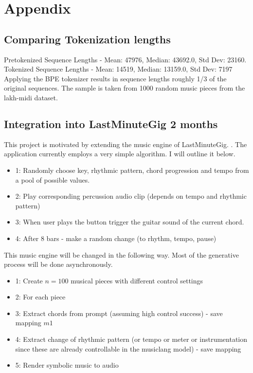 
\chapter{Appendix}
\section{Comparing Tokenization lengths}
\label{tok_compare}
Pretokenized Sequence Lengths - Mean: 47976, Median: 43692.0, Std Dev: 23160.\\
Tokenized Sequence Lengths - Mean: 14519, Median: 13159.0, Std Dev: 7197\\

Applying the BPE tokenizer results in sequence lengths roughly 1/3 of the original sequences. The sample is taken from 1000 random music pieces from the lakh-midi dataset. 



\section{Integration into LastMinuteGig 2 months}
This project is motivated by extending the music engine of LastMinuteGig. \cite{Chalkiadakis_2022}. The application currently employs a very simple algorithm. I will outline it below. 
\begin{itemize}
    \item{1}: Randomly choose key, rhythmic pattern, chord progression and tempo from a pool of possible values.
    \item{2}: Play corresponding percussion audio clip (depends on tempo and rhythmic pattern)
    \item{3}: When user plays the button trigger the guitar sound of the current chord.
    \item{4}: After 8 bars - make a random change (to rhythm, tempo, pause)
\end{itemize}


This music engine will be changed in the following way. Most of the generative process will be done asynchronously.
\begin{itemize}
    \item{1}: Create $n=100$ musical pieces with different control settings
    \item{2}: For each piece
    \item{3}: Extract chords from prompt (assuming high control success) - save mapping $m1$
    \item{4}: Extract change of rhythmic pattern (or tempo or meter or instrumentation since these are already controllable in the musiclang model) - save mapping
    \item{5}: Render symbolic music to audio
\end{itemize}

